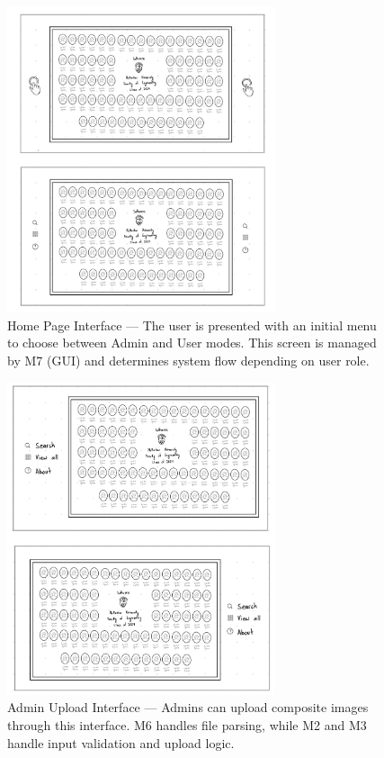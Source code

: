 \documentclass[12pt, titlepage]{article}
\begin{document}
\begin{figure}[H]
\centering
\includegraphics[width=0.7\textwidth]{IMG_0067.png}
\caption{Home Page Interface — The user is presented with an initial menu to choose between Admin and User modes. This screen is managed by M7 (GUI) and determines system flow depending on user role.}
\label{FigUIHome}
\end{figure}

\begin{figure}[H]
\centering
\includegraphics[width=0.7\textwidth]{IMG_0069.png}
\caption{Admin Upload Interface — Admins can upload composite images through this interface. M6 handles file parsing, while M2 and M3 handle input validation and upload logic.}
\label{FigUIUpload}
\end{figure}
\end{document}
